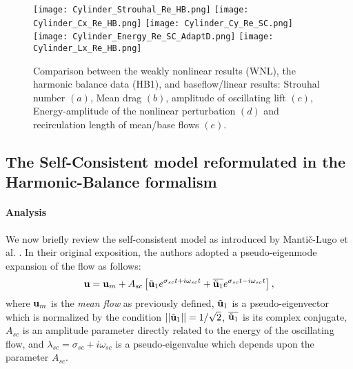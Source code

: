 \documentclass[twocolumn,10pt]{asme2ej}
\newcommand{\be}[1]{ \begin{equation} \label{#1}}
\newcommand{\ee}{\end{equation}}
\begin{document}
\begin{figure}
\begin{center}
\texttt{[image: Cylinder\_Strouhal\_Re\_HB.png]}
\texttt{[image: Cylinder\_Cx\_Re\_HB.png]}
\texttt{[image: Cylinder\_Cy\_Re\_SC.png]}
\texttt{[image: Cylinder\_Energy\_Re\_SC\_AdaptD.png]}
\texttt{[image: Cylinder\_Lx\_Re\_HB.png]}
\end{center}
\caption{Comparison between the weakly nonlinear results (WNL), the harmonic balance data (HB1), and baseflow/linear results: Strouhal number $(a)$, Mean drag $(b)$, amplitude of oscillating lift $(c)$, Energy-amplitude of the nonlinear perturbation $(d)$ and recirculation length of mean/base flows $(e)$. 
}
\label{fig:HB_SC_DATA_COMP}
\end{figure}



\subsection{The Self-Consistent model reformulated in the Harmonic-Balance formalism }
\paragraph{Analysis}



We now briefly review the self-consistent model as introduced by Manti\v{c}-Lugo et 
al. \cite{MLugo2014}.
In their original exposition, the authors adopted a pseudo-eigenmode expansion of the flow 
as follows: 
\be{SC}
{\bf u } = {\bf u }_m + A_{sc} \left[ \tilde{{\bf u }}_1 e^{\sigma_{sc} t + i \omega_{sc} t} +   \overline{\tilde{\bf u }_1} e^{\sigma_{sc} t  -i \omega_{sc} t} \right],
\ee  
where ${\bf u }_m$ is the {\em mean flow} as previously defined, $\tilde{{\bf u }}_1$ is a pseudo-eigenvector which is normalized by the condition  $||\tilde{{\bf u }}_1|| = 1/\sqrt{2}$, $\overline{\tilde{{\bf u }}_1}$ is its complex conjugate,
$A_{sc}$ is an amplitude parameter directly related to the energy of the oscillating flow, and $\lambda_{sc} = \sigma_{sc} + i \omega_{sc}$ is a pseudo-eigenvalue which depends upon the parameter $A_{sc}$. 
\end{document}
